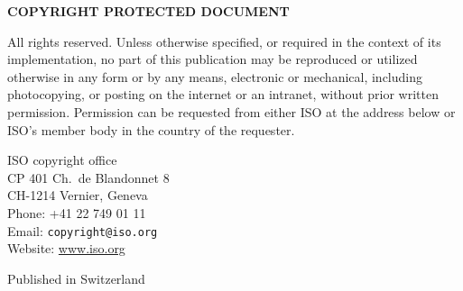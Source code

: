 \vspace{1ex}
\qquad\Large{\textbf{COPYRIGHT PROTECTED DOCUMENT}}
\vspace{2ex}

\isocopyright

All rights reserved. Unless otherwise specified,
or required in the context of its implementation,
no part of this publication may be reproduced or
utilized otherwise in any form or by any means,
electronic or mechanical, including photocopying,
or posting on the internet or an intranet,
without prior written permission.
Permission can be requested
from either ISO at the address below
or ISO's member body in the country of the requester.

\begin{indented}
%
ISO copyright office\\
CP 401 \textbullet{} Ch.\ de Blandonnet 8\\
CH-1214 Vernier, Geneva\\
Phone: +41 22 749 01 11\\
Email: \texttt{copyright@iso.org}\\
Website: \url{www.iso.org}
\end{indented}

Published in Switzerland

\newpage

